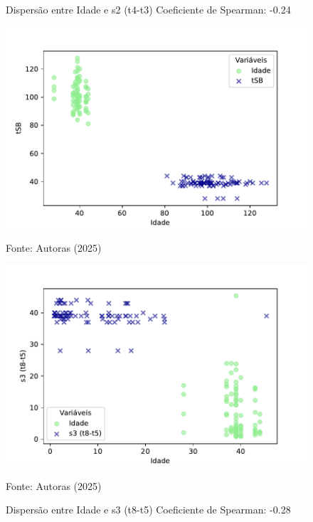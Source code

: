 \begin{figure}[h]
    \captionsetup{font=footnotesize, justification=centering, labelsep=period, position=above}
    \centering
    \begin{minipage}[b]{0.45\linewidth}
        \caption{Dispersão entre Idade e s2 (t4-t3) Coeficiente de Spearman: -0.24}
        \label{fig:idade-s2}
        \centering
        \includegraphics[scale=0.47]{figuras/Spearman/idade-tSB.pdf}
        \vspace{0.3cm}
        \begin{minipage}{\linewidth}
            \centering
            \scriptsize{Fonte: Autoras (2025)}
        \end{minipage}
    \end{minipage}
    \hspace{0.05\linewidth}
    \begin{minipage}[b]{0.45\linewidth}
        \caption{Dispersão entre Idade e s3 (t8-t5) Coeficiente de Spearman: -0.28}
        \label{fig:idade-s3}
        \centering
        \includegraphics[scale=0.35]{figuras/Spearman/idade-s3.pdf}
        \vspace{0.3cm}
        \begin{minipage}{\linewidth}
            \centering
            \scriptsize{Fonte: Autoras (2025)}
        \end{minipage}
    \end{minipage}
\end{figure}
\FloatBarrier

